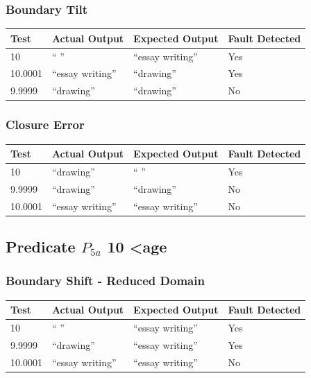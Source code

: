 \documentclass[11pt, oneside]{article}   	%
\begin{document}
\subsubsection{Boundary Tilt}
\begin{table}[!htb]
\centering
\begin{tabular}{|l|l|l|l|}
\hline
Test    & Actual Output   & Expected Output & Fault Detected \\ \hline
10      & “ ”             & “essay writing” & Yes            \\ \hline
10.0001 & “essay writing” & “drawing”       & Yes            \\ \hline
9.9999  & “drawing”       & “drawing”       & No             \\ \hline
\end{tabular}
\end{table}

\subsubsection{Closure Error}
\begin{table}[!htb]
\centering
\begin{tabular}{|l|l|l|l|}
\hline
Test    & Actual Output   & Expected Output & Fault Detected \\ \hline
10      & “drawing”       & “ ”             & Yes            \\ \hline
9.9999  & “drawing”       & “drawing”       & No             \\ \hline
10.0001 & “essay writing” & “essay writing” & No             \\ \hline
\end{tabular}
\end{table}
\newpage

\subsection{Predicate $P_{5a}$ 10 \textless age}
\subsubsection{Boundary Shift - Reduced Domain}
\begin{table}[!htb]
\centering
\begin{tabular}{|l|l|l|l|}
\hline
Test    & Actual Output   & Expected Output & Fault Detected \\ \hline
10      & “ ”             & “essay writing” & Yes            \\ \hline
9.9999  & “drawing”       & “essay writing” & Yes            \\ \hline
10.0001 & “essay writing” & “essay writing” & No             \\ \hline
\end{tabular}
\end{table}
\end{document}
